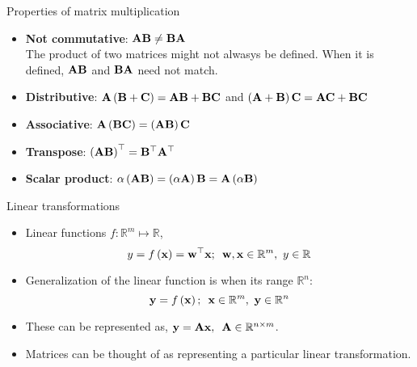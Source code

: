 \documentclass[aspectratio=169]{beamer}
\begin{document}
\begin{frame}[t]{Properties of matrix multiplication}
  \begin{itemize}
    \item \textbf{Not commutative}: $\mathbf{A}\mathbf{B} \neq \mathbf{B}\mathbf{A}$\\
    The product of two matrices might not alwasys be defined. When it is defined, $\mathbf{A}\mathbf{B}$ and $\mathbf{B}\mathbf{A}$ need not match.
    \item \textbf{Distributive}:  $\mathbf{A}\left(\mathbf{B} + \mathbf{C}\right) = \mathbf{A}\mathbf{B} + \mathbf{B}\mathbf{C}$ and $\left(\mathbf{A} + \mathbf{B}\right)\mathbf{C} = \mathbf{A}\mathbf{C} + \mathbf{B}\mathbf{C}$ 
    \item \textbf{Associative}: $\mathbf{A}\left(\mathbf{B}\mathbf{C}\right) = \left(\mathbf{A}\mathbf{B}\right)\mathbf{C} $
    \item \textbf{Transpose}: $\left(\mathbf{A}\mathbf{B}\right)^{\top} = \mathbf{B}^{\top}\mathbf{A}^{\top}$
    \item \textbf{Scalar product}: $\alpha\left(\mathbf{A}\mathbf{B}\right) = \left(\alpha \mathbf{A}\right)\mathbf{B} = \mathbf{A}\left(\alpha \mathbf{B}\right)$
  \end{itemize}
\end{frame}


\begin{frame}[t]{Linear transformations}
  \begin{itemize}
    \item Linear functions $f: \mathbb{R}^m \mapsto \mathbb{R}$, 
    $$y = f\left(\mathbf{x}\right) = \mathbf{w}^{\top}\mathbf{x}; \,\,\, \mathbf{w}, \mathbf{x} \in \mathbb{R}^m, \,\, y \in \mathbb{R}$$
    
    \item Generalization of the linear function is when its range $\mathbb{R}^n$:
    $$\mathbf{y} = f\left(\mathbf{x}\right); \,\,\, \mathbf{x} \in \mathbb{R}^m, \,\, \mathbf{y} \in \mathbb{R}^n$$
    
    \item These can be represented as, $\mathbf{y} = \mathbf{Ax}, \,\,\, \mathbf{A} \in \mathbb{R}^{n \times m}$.\\
    
    \item Matrices can be thought of as representing a particular linear transformation.
  \end{itemize}
\end{frame}
\end{document}
